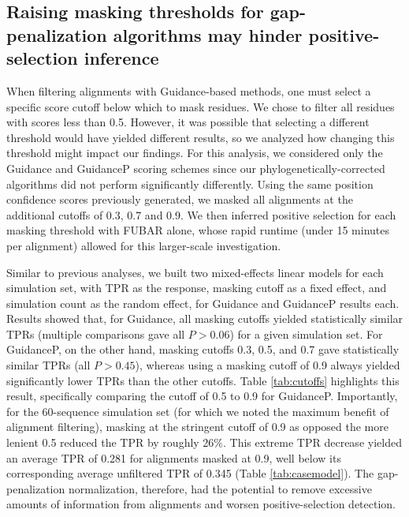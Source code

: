 \documentclass[10pt]{article}
\begin{document}
\subsection*{Raising masking thresholds for gap-penalization algorithms may hinder positive-selection inference}

When filtering alignments with Guidance-based methods, one must select a specific score cutoff below which to mask residues. We chose to filter all residues with scores less than 0.5. However, it was possible that selecting a different threshold would have yielded different results, so we analyzed how changing this threshold might impact our findings. For this analysis, we considered only the Guidance and GuidanceP scoring schemes since our phylogenetically-corrected algorithms did not perform significantly differently. Using the same position confidence scores previously generated, we masked all alignments at the additional cutoffs of 0.3, 0.7 and 0.9. We then inferred positive selection for each masking threshold with FUBAR alone, whose rapid runtime (under 15 minutes per alignment) allowed for this larger-scale investigation. 

Similar to previous analyses, we built two mixed-effects linear models for each simulation set, with TPR as the response, masking cutoff as a fixed effect, and simulation count as the random effect, for Guidance and GuidanceP results each. Results showed that, for Guidance, all masking cutoffs yielded statistically similar TPRs (multiple comparisons gave all $P>0.06$) for a given simulation set. For GuidanceP, on the other hand, masking cutoffs 0.3, 0.5, and 0.7 gave statistically similar TPRs (all $P>0.45$), whereas using a masking cutoff of 0.9 always yielded significantly lower TPRs than the other cutoffs. Table \ref{tab:cutoffs} highlights this result, specifically comparing the cutoff of 0.5 to 0.9 for GuidanceP. Importantly, for the 60-sequence simulation set (for which we noted the maximum benefit of alignment filtering), masking at the stringent cutoff of 0.9 as opposed the more lenient 0.5 reduced the TPR by roughly 26\%. This extreme TPR decrease yielded an average TPR of 0.281 for alignments masked at 0.9, well below its corresponding average unfiltered TPR of 0.345 (Table \ref{tab:casemodel}). The gap-penalization normalization, therefore, had the potential to remove excessive amounts of information from alignments and worsen positive-selection detection. 

\end{document}
